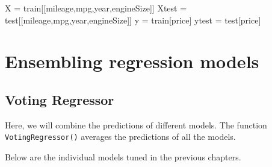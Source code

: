 \documentclass[
  letterpaper,
  DIV=11,
  numbers=noendperiod]{scrreprt}
\newenvironment{Shaded}{\begin{snugshade}}{\end{snugshade}}
\newcommand{\NormalTok}[1]{\textcolor[rgb]{0.00,0.23,0.31}{#1}}
\newcommand{\OperatorTok}[1]{\textcolor[rgb]{0.37,0.37,0.37}{#1}}
\newcommand{\StringTok}[1]{\textcolor[rgb]{0.13,0.47,0.30}{#1}}
\begin{document}
\begin{Shaded}
\begin{Highlighting}[]
\NormalTok{X }\OperatorTok{=}\NormalTok{ train[[}\StringTok{\textquotesingle{}mileage\textquotesingle{}}\NormalTok{,}\StringTok{\textquotesingle{}mpg\textquotesingle{}}\NormalTok{,}\StringTok{\textquotesingle{}year\textquotesingle{}}\NormalTok{,}\StringTok{\textquotesingle{}engineSize\textquotesingle{}}\NormalTok{]]}
\NormalTok{Xtest }\OperatorTok{=}\NormalTok{ test[[}\StringTok{\textquotesingle{}mileage\textquotesingle{}}\NormalTok{,}\StringTok{\textquotesingle{}mpg\textquotesingle{}}\NormalTok{,}\StringTok{\textquotesingle{}year\textquotesingle{}}\NormalTok{,}\StringTok{\textquotesingle{}engineSize\textquotesingle{}}\NormalTok{]]}
\NormalTok{y }\OperatorTok{=}\NormalTok{ train[}\StringTok{\textquotesingle{}price\textquotesingle{}}\NormalTok{]}
\NormalTok{ytest }\OperatorTok{=}\NormalTok{ test[}\StringTok{\textquotesingle{}price\textquotesingle{}}\NormalTok{]}
\end{Highlighting}
\end{Shaded}

\section{Ensembling regression
models}\label{ensembling-regression-models}

\subsection{Voting Regressor}\label{voting-regressor}

Here, we will combine the predictions of different models. The function
\texttt{VotingRegressor()} averages the predictions of all the models.

Below are the individual models tuned in the previous chapters.
\end{document}
